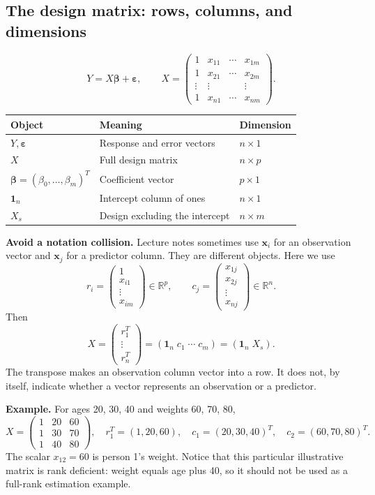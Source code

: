 \documentclass[11pt]{article}
\newcommand{\R}{\mathbb R}\newcommand{\one}{\mathbf 1}\newcommand{\be}{\boldsymbol\beta}\newcommand{\eps}{\boldsymbol\varepsilon}
\begin{document}
\subsection{The design matrix: rows, columns, and dimensions}
\[
Y=X\be+\eps,\qquad
X=\begin{pmatrix}1&x_{11}&\cdots&x_{1m}\\1&x_{21}&\cdots&x_{2m}\\\vdots&\vdots&&\vdots\\1&x_{n1}&\cdots&x_{nm}\end{pmatrix}.
\]
\begin{center}
\begin{tabular}{lll}\toprule
Object&Meaning&Dimension\\\midrule
$Y,\eps$&Response and error vectors&$n\times1$\\
$X$&Full design matrix&$n\times p$\\
$\be=(\beta_0,\ldots,\beta_m)^T$&Coefficient vector&$p\times1$\\
$\one_n$&Intercept column of ones&$n\times1$\\
$X_s$&Design excluding the intercept&$n\times m$\\\bottomrule
\end{tabular}
\end{center}
\textbf{Avoid a notation collision.} Lecture notes sometimes use $\mathbf x_i$ for an observation vector and $\mathbf x_j$ for a predictor column. They are different objects. Here we use
\[
r_i=\begin{pmatrix}1\\x_{i1}\\\vdots\\x_{im}\end{pmatrix}\in\R^p,
\qquad c_j=\begin{pmatrix}x_{1j}\\x_{2j}\\\vdots\\x_{nj}\end{pmatrix}\in\R^n.
\]
Then
\[
X=\begin{pmatrix}r_1^T\\\vdots\\r_n^T\end{pmatrix}
=(\one_n\;c_1\;\cdots\;c_m)=(\one_n\;X_s).
\]
The transpose makes an observation column vector into a row. It does not, by itself, indicate whether a vector represents an observation or a predictor.

\textbf{Example.} For ages 20, 30, 40 and weights 60, 70, 80,
\[
X=\begin{pmatrix}1&20&60\\1&30&70\\1&40&80\end{pmatrix},\quad
r_1^T=(1,20,60),\quad c_1=(20,30,40)^T,\quad c_2=(60,70,80)^T.
\]
The scalar $x_{12}=60$ is person 1's weight. Notice that this particular illustrative matrix is rank deficient: weight equals age plus 40, so it should not be used as a full-rank estimation example.
\end{document}
